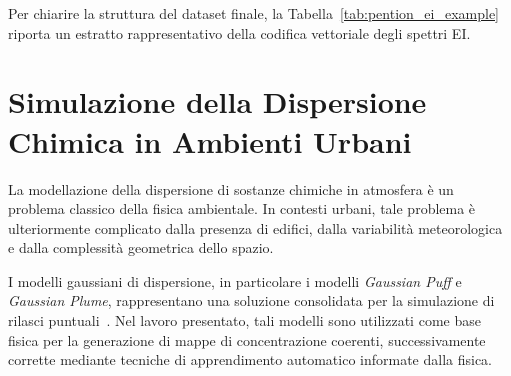 Per chiarire la struttura del dataset finale, la Tabella~\ref{tab:pention_ei_example} riporta un estratto rappresentativo della codifica vettoriale degli spettri EI.

\begin{table}[H]
	\centering
	\footnotesize

	\caption{Esempio di rappresentazione vettoriale degli spettri EI nel dataset \texttt{PENTION\_EI\_Complete}.}
	\label{tab:pention_ei_example}
\end{table}


\section{Simulazione della Dispersione Chimica in Ambienti Urbani}
\label{sec:dispersion}

La modellazione della dispersione di sostanze chimiche in atmosfera è un problema classico della fisica ambientale.
In contesti urbani, tale problema è ulteriormente complicato dalla presenza di edifici, dalla variabilità meteorologica e dalla complessità geometrica dello spazio.

I modelli gaussiani di dispersione, in particolare i modelli \emph{Gaussian Puff} e \emph{Gaussian Plume}, rappresentano una soluzione consolidata per la simulazione di rilasci puntuali~\cite{turner_gaussian}.
Nel lavoro presentato, tali modelli sono utilizzati come base fisica per la generazione di mappe di concentrazione coerenti, successivamente corrette mediante tecniche di apprendimento automatico informate dalla fisica.

